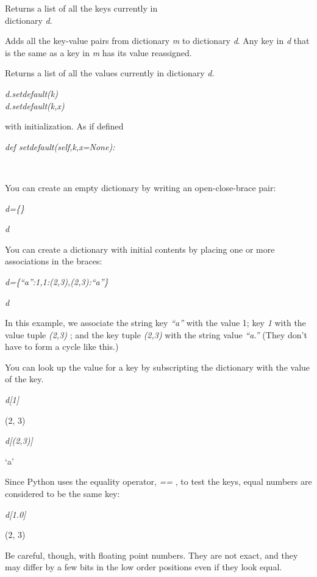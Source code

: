Returns a list of all the keys
currently in\\
dictionary \emph{d}.



Adds all the key-value pairs from
dictionary \emph{m} to dictionary \emph{d}. Any key in \emph{d} that is
the same as a key in \emph{m} has its value reassigned.



Returns a list of all the values
currently in dictionary \emph{d}.

 \emph{d.setdefault(k)\\
d.setdefault(k,x)}


with initialization. As if defined

 \emph{def
setdefault(self,k,x=None):}











~

You can create an empty dictionary
by writing an open-close-brace pair:


\emph{d=\{\}}


\emph{d}



You can create a dictionary with
initial contents by placing one or more associations in the braces:


\emph{d=\{``a'':1,1:(2,3),(2,3):``a''\}}


\emph{d}



In this example, we associate the
string key \emph{``a''} with the value 1; key \emph{1} with the value
tuple \emph{(2,3)} ; and the key tuple \emph{(2,3)} with the string
value \emph{``a.''} (They don't have to form a cycle like this.)

You can look up the value for a key
by subscripting the dictionary with the value of the key.


\emph{d{[}1{]}}

(2, 3)


\emph{d{[}(2,3){]}}

`a'

Since Python uses the equality
operator, \emph{==} , to test the keys, equal numbers are considered to
be the same key:


\emph{d{[}1.0{]}}

(2, 3)

Be careful, though, with floating
point numbers. They are not exact, and they may differ by a few bits in
the low order positions even if they look equal.

